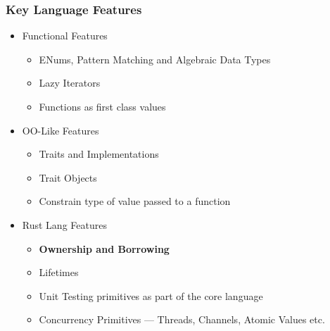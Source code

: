 \begin{frame}
  \frametitle{Key Language Features}
  \begin{itemize}
  \item Functional Features
    \begin{itemize}
    \item ENums, Pattern Matching and Algebraic Data Types
    \item Lazy Iterators
    \item Functions as first class values
    \end{itemize}
  \item OO-Like Features
    \begin{itemize}
    \item Traits and Implementations
    \item Trait Objects
    \item Constrain type of value passed to a function
    \end{itemize}
  \item Rust Lang Features
    \begin{itemize}
    \item \textbf{Ownership and Borrowing}
    \item Lifetimes
    \item Unit Testing primitives as part of the core language
    \item Concurrency Primitives --- Threads, Channels, Atomic Values etc.
    \end{itemize}
  \end{itemize}
\end{frame}
